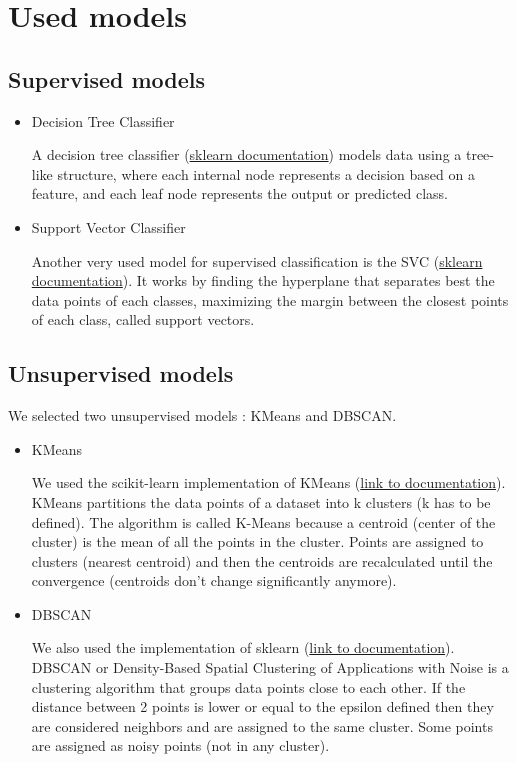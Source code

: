 \documentclass[10pt, a4paper]{article}
\begin{document}
\section{Used models}
\subsection{Supervised models}

\begin{itemize}
    \item Decision Tree Classifier
    
    A decision tree classifier (\href{https://scikit-learn.org/stable/modules/generated/sklearn.tree.DecisionTreeClassifier.html#sklearn.tree.DecisionTreeClassifier}{sklearn documentation}) models data using a tree-like structure, where each internal node represents a decision based on a feature, and each leaf node represents the output or predicted class.

    \item Support Vector Classifier
    
    Another very used model for supervised classification is the SVC (\href{https://scikit-learn.org/stable/modules/generated/sklearn.svm.SVC.html#sklearn.svm.SVC}{sklearn documentation}). It works by finding the hyperplane that separates best the data points of each classes, maximizing the margin between the closest points of each class, called support vectors. 
    
\end{itemize}

\subsection{Unsupervised models}
We selected two unsupervised models : KMeans and DBSCAN.
\begin{itemize}
    \item KMeans
    
    We used the scikit-learn implementation of KMeans (\href{https://scikit-learn.org/stable/modules/generated/sklearn.cluster.KMeans.html#sklearn.cluster.KMeans}{link to documentation}). KMeans partitions the data points of a dataset into k clusters (k has to be defined). The algorithm is called K-Means because a centroid (center of the cluster) is the mean of all the points in the cluster. Points are assigned to clusters (nearest centroid) and then the centroids are recalculated until the convergence (centroids don't change significantly anymore).


    \item DBSCAN
    
    We also used the implementation of sklearn (\href{https://scikit-learn.org/stable/modules/generated/sklearn.cluster.DBSCAN.html}{link to documentation}). DBSCAN or Density-Based Spatial Clustering of Applications with Noise is a clustering algorithm that groups data points close to each other. If the distance between 2 points is lower or equal to the epsilon defined then they are considered neighbors and are assigned to the same cluster. Some points are assigned as noisy points (not in any cluster).
\end{itemize}
\newpage
\end{document}
